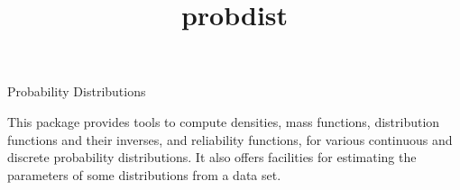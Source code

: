\documentclass[12pt]{article}
\begin{document}
\begin{titlepage}

\title{probdist}{Probability Distributions}

This package provides tools to compute densities, mass functions,
distribution functions and their inverses, and reliability functions,
for various continuous and discrete probability distributions.
It also offers facilities for estimating the parameters of some
distributions from a data set.

\vfill
\end{titlepage}


\tableofcontents
{}













































































\end{document}
